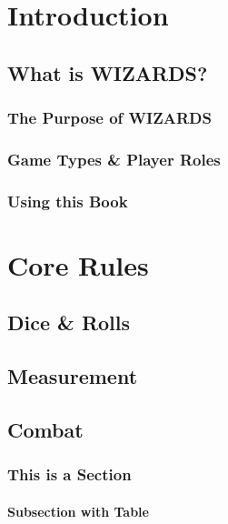\documentclass{wizards-book}
\begin{document}
\tableofcontents


\newpage

\part{Introduction}

\chapter{What is WIZARDS?}
\section{The Purpose of WIZARDS}
\section{Game Types \& Player Roles}
\section{Using this Book}


\part{Core Rules}

\chapter{Dice \& Rolls}
\chapter{Measurement}
\chapter{Combat}


\section{This is a Section}


\subsection{Subsection with Table}
\end{document}
